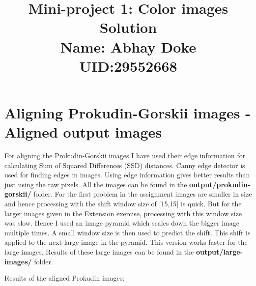 \documentclass[10pt,letterpaper]{article}
\title{
  \textbf{Mini-project 1: Color images Solution} \\
  \textbf{Name: Abhay Doke}\\
  \textbf{UID:29552668}
}
\date{}
\begin{document}
\maketitle

\section{Aligning Prokudin-Gorskii images - Aligned output images} 
For aligning the Prokudin-Gorskii images I have used their edge information for calculating Sum of Squared Differences (SSD) distances.
Canny edge detector is used for finding edges in images. Using edge information gives better results than just using the raw pixels.
All the images can be found in the \textbf{output/prokudin-gorskii/} folder.\newline
For the first problem in the assignment images are smaller in size and hence processing with the shift window size of [15,15] is quick. But for the larger images given in the Extension exercise, processing with this window size was slow. Hence I used an image pyramid which scales down the bigger image multiple times. A small window size is then used to predict the shift. This shift is applied to the next large image in the pyramid. This version works faster for the large images. Results of these large images can be found in the \textbf{output/large-images/} folder.\newline\newline

Results of the aligned Prokudin images:
\begin{figure}
\centering
\mbox{\quad
{}}
\end{figure}
\end{document}

